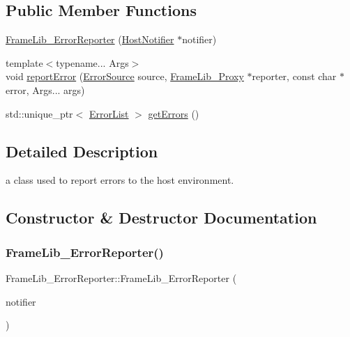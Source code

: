 \subsection*{Public Member Functions}
\begin{DoxyCompactItemize}
\item 
\hyperlink{class_frame_lib___error_reporter_a6caa37f2bec568844bdccf55ce1d6c74}{Frame\+Lib\+\_\+\+Error\+Reporter} (\hyperlink{struct_frame_lib___error_reporter_1_1_host_notifier}{Host\+Notifier} $\ast$notifier)
\item 
{\footnotesize template$<$typename... Args$>$ }\\void \hyperlink{class_frame_lib___error_reporter_a69301a8520fa2d90ce84a637f7bc7827}{report\+Error} (\hyperlink{_frame_lib___errors_8h_acdeab3b10c3aca41a844aa51b90b6f39}{Error\+Source} source, \hyperlink{struct_frame_lib___proxy}{Frame\+Lib\+\_\+\+Proxy} $\ast$reporter, const char $\ast$error, Args... args)
\item 
std\+::unique\+\_\+ptr$<$ \hyperlink{class_frame_lib___error_reporter_1_1_error_list}{Error\+List} $>$ \hyperlink{class_frame_lib___error_reporter_a95924f411be44edbe7e69f92e983e89e}{get\+Errors} ()
\end{DoxyCompactItemize}


\subsection{Detailed Description}
a class used to report errors to the host environment. 

\subsection{Constructor \& Destructor Documentation}
\mbox{\label{class_frame_lib___error_reporter_a6caa37f2bec568844bdccf55ce1d6c74}} 
\subsubsection{\texorpdfstring{Frame\+Lib\+\_\+\+Error\+Reporter()}{FrameLib\_ErrorReporter()}}
{\footnotesize\ttfamily Frame\+Lib\+\_\+\+Error\+Reporter\+::\+Frame\+Lib\+\_\+\+Error\+Reporter (\begin{DoxyParamCaption}\item[{\hyperlink{struct_frame_lib___error_reporter_1_1_host_notifier}{Host\+Notifier} $\ast$}]{notifier }\end{DoxyParamCaption})\hspace{0.3cm}{\ttfamily [inline]}}



